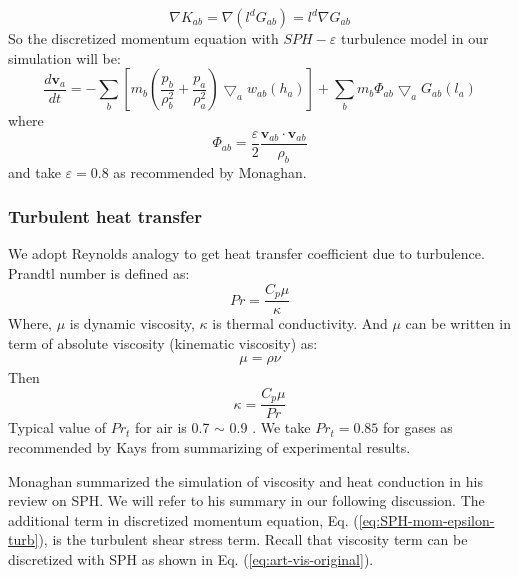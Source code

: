 \documentclass[journal abbreviation, manuscript]{copernicus}
\begin{document}


\begin{equation}
\nabla K_{ab} = \nabla (l^d G_{ab}) = l^d \nabla G_{ab}
\end{equation}
So the discretized momentum equation with $SPH-\varepsilon$ turbulence model in our simulation will be:
\begin{equation}
\label{eq:SPH-mom-epsilon-turb}
\dfrac{d \textbf{v}_a}{dt} = -\sum_b [m_b (\dfrac{p_b}{\rho_b^2} + \dfrac{p_a}{\rho_a^2}) \bigtriangledown_aw_{a b}(h_a)] + \sum_b m_b \Phi_{ab}\bigtriangledown_aG_{ab}(l_a)
\end{equation}
where 
\begin{equation}
\Phi_{ab}=\dfrac{\varepsilon}{2} \dfrac{\textbf{v}_{ab} \cdot \textbf{v}_{ab}}{\rho_b} 
\end{equation}
and take $\varepsilon = 0.8$ as recommended by Monaghan.

\subsubsection{Turbulent heat transfer}
We adopt Reynolds analogy to get heat transfer coefficient due to turbulence.
Prandtl number is defined as:
\begin{equation}
Pr=\dfrac{C_p \mu}{\kappa}
\end{equation}
Where, $\mu$ is dynamic viscosity, $\kappa$ is thermal conductivity. And $\mu$  can be written in term of absolute viscosity (kinematic viscosity) as:
\begin{align}
\mu=\rho \nu
\end{align}
Then
\begin{equation}
\kappa=\dfrac{C_p \mu}{Pr}
\end{equation}
Typical value of $Pr_t$ for air is 0.7 $\sim$ 0.9 . We take $Pr_t=0.85$ for gases as recommended by Kays \citep{kays1994turbulent} from summarizing of experimental results. 

Monaghan \citep{monaghan2005smoothed} summarized the simulation of viscosity and heat conduction in his review on SPH. We will refer to his summary in our following discussion. The additional term in discretized momentum equation, Eq. (\ref{eq:SPH-mom-epsilon-turb}), is the turbulent shear stress term. 
Recall that viscosity term can be discretized with SPH as shown in Eq. (\ref{eq:art-vis-original}). 
\end{document}
